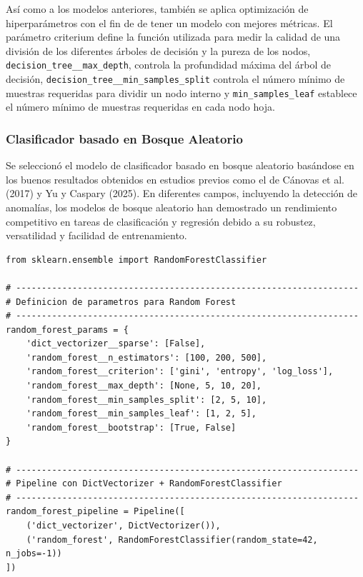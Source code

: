 \documentclass[11pt,a4paper,spanish]{book}
\numberwithin{equation}{chapter}
\numberwithin{figure}{chapter}
\begin{document}
Así como a los modelos anteriores, también se aplica optimización de hiperparámetros con el fin de  de tener un modelo con mejores métricas. El parámetro criterium define la función utilizada para medir la calidad de una división de los diferentes árboles de decisión y la pureza de los nodos, \lstinline|decision_tree__max_depth|, controla la profundidad máxima del árbol de decisión, \lstinline|decision_tree__min_samples_split|  controla el número mínimo de muestras requeridas para dividir un nodo interno y \lstinline|min_samples_leaf| establece el número mínimo de muestras requeridas en cada nodo hoja. 


\subsubsection{Clasificador basado en Bosque Aleatorio}

Se seleccionó el modelo de clasificador basado en bosque aleatorio basándose en los buenos resultados obtenidos en estudios previos como el de Cánovas et al. (2017) y  Yu y Caspary (2025). En diferentes campos, incluyendo la detección de anomalías, los modelos de bosque aleatorio han demostrado un rendimiento competitivo en tareas de clasificación y regresión debido a su robustez, versatilidad y facilidad de entrenamiento. 


\vspace{5mm}
\begin{lstlisting}
from sklearn.ensemble import RandomForestClassifier

# -------------------------------------------------------------------
# Definicion de parametros para Random Forest
# -------------------------------------------------------------------
random_forest_params = {
    'dict_vectorizer__sparse': [False],
    'random_forest__n_estimators': [100, 200, 500],   
    'random_forest__criterion': ['gini', 'entropy', 'log_loss'],
    'random_forest__max_depth': [None, 5, 10, 20],
    'random_forest__min_samples_split': [2, 5, 10],
    'random_forest__min_samples_leaf': [1, 2, 5],
    'random_forest__bootstrap': [True, False]
}

# -------------------------------------------------------------------
# Pipeline con DictVectorizer + RandomForestClassifier
# -------------------------------------------------------------------
random_forest_pipeline = Pipeline([
    ('dict_vectorizer', DictVectorizer()),
    ('random_forest', RandomForestClassifier(random_state=42, n_jobs=-1))
])
\end{lstlisting}
\end{document}
